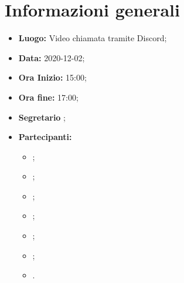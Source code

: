 \documentclass[11pt]{article}
\begin{document}
	
	
	
	
	
	\newpage
	\tableofcontents
	\newpage
	
	\section{Informazioni generali}
	\begin{itemize}
		\item \textbf{Luogo:} Video chiamata tramite Discord;
		\item \textbf{Data:} 2020-12-02;
		\item \textbf{Ora Inizio:} 15:00;
		\item \textbf{Ora fine:} 17:00;
		\item \textbf{Segretario} \SB;
		\item \textbf{Partecipanti:}
		\begin{itemize}
			\item \MB;
			\item \VAS;
			\item \FD;
			\item \NM;
			\item \SB;
			\item \GB;
			\item \MDI.
		\end{itemize}	
	\end{itemize}
	
	
	\newpage
	
	
	
\newpage	
	
	
\end{document}
